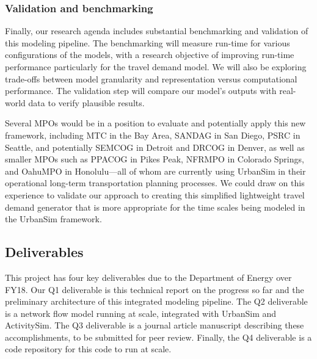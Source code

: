 \subsubsection{Validation and benchmarking}

Finally, our research agenda includes substantial benchmarking and validation of this modeling pipeline. The benchmarking will measure run-time for various configurations of the models, with a research objective of improving run-time performance particularly for the travel demand model. We will also be exploring trade-offs between model granularity and representation versus computational performance. The validation step will compare our model's outputs with real-world data to verify plausible results.

Several MPOs would be in a position to evaluate and potentially apply this new framework, including MTC in the Bay Area, SANDAG in San Diego, PSRC in Seattle, and potentially SEMCOG in Detroit and DRCOG in Denver, as well as smaller MPOs such as PPACOG in Pikes Peak, NFRMPO in Colorado Springs, and OahuMPO in Honolulu---all of whom are currently using UrbanSim in their operational long-term transportation planning processes. We could draw on this experience to validate our approach to creating this simplified lightweight travel demand generator that is more appropriate for the time scales being modeled in the UrbanSim framework. 

\subsection{Deliverables}
This project has four key deliverables due to the Department of Energy over FY18. Our Q1 deliverable is this technical report on the progress so far and the preliminary architecture of this integrated modeling pipeline. The Q2 deliverable is a network flow model running at scale, integrated with UrbanSim and ActivitySim. The Q3 deliverable is a journal article manuscript describing these accomplishments, to be submitted for peer review. Finally, the Q4 deliverable is a code repository for this code to run at scale.
